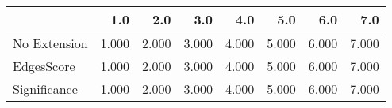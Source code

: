 \begin{tabular}{lrrrrrrr}
\toprule
{} &   1.0 &   2.0 &   3.0 &   4.0 &   5.0 &   6.0 &   7.0 \\
\midrule
No Extension & 1.000 & 2.000 & 3.000 & 4.000 & 5.000 & 6.000 & 7.000 \\
EdgesScore   & 1.000 & 2.000 & 3.000 & 4.000 & 5.000 & 6.000 & 7.000 \\
Significance & 1.000 & 2.000 & 3.000 & 4.000 & 5.000 & 6.000 & 7.000 \\
\bottomrule
\end{tabular}
